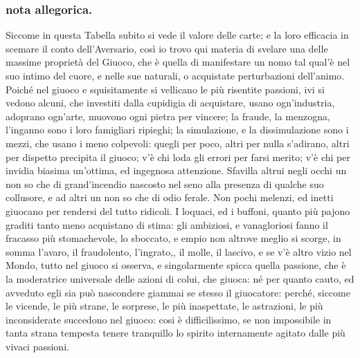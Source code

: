 \documentclass[11pt,a6paper]{article}
\begin{document}
\subsubsection{nota allegorica.}
{\footnotesize
 Siccome in questa Tabella subito si vede il
 valore delle carte; e la loro efficacia in scemare il conto
dell'Aversario, così io trovo qui materia di svelare
una delle massime proprietà del Giuoco, che è
quella di manifestare un nomo tal qual'è nel suo intimo
del cuore, e nelle sue naturali, o acquistate perturbazioni
dell'animo. Poiché nel giuoco e squisitamente
si vellicano le più risentite passioni, ivi si
vedono alcuni, che investiti dalla cupidigia di
acquistare, usano ogn'industria, adoprano ogn'arte,
muovono ogni pietra per vincere; la fraude, la
menzogna, l'inganno sono i loro famigliari ripieghi; la
simulazione, e la dissimulazione sono i
mezzi, che usano i meno colpevoli: quegli per poco,
altri per nulla s'adirano, altri per dispetto
precipita il giuoco; v'è chi loda gli errori per farsi merito;
v'è chi per invidia biasima un'ottima, ed ingegnosa
attenzione. Sfavilla altrui negli occhi un non so che di
grand'incendio nascosto nel seno alla presenza di
qualche suo collusore, e ad altri un non so che di
odio ferale. Non pochi melenzi, ed inetti giuocano
per rendersi del tutto ridicoli. I loquaci, ed i
buffoni, quanto più pajono graditi tanto meno acquistano
di stima: gli ambiziosi, e vanagloriosi fanno il fracasso
più stomachevole, lo sboccato, e empio non
altrove meglio si scorge, in somma l'avaro, il fraudolento,
l'ingrato,, il molle, il lascivo, e se v'è altro
vizio nel Mondo, tutto nel giuoco si osserva, e
singolarmente spicca quella passione, che è la moderatrice
universale delle azioni di colui, che giuoca:
né per quanto cauto, ed avveduto egli sia può
nascondere giammai se stesso il giuocatore: perché,
siccome le vicende, le più strane, le sorprese, le più
inaspettate, le astrazioni, le più inconsiderate
succedono nel giuoco: cosi è difficilissimo, se non
impossibile in tanta strana tempesta tenere tranquillo
lo spirito internamente agitato dalle più vivaci
passioni.

}
\end{document}

